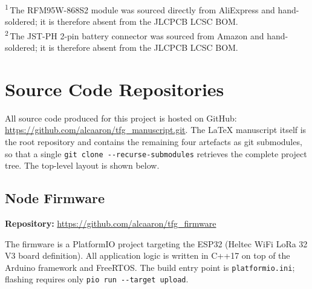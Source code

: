 \documentclass[english,bachelor]{tfgitic}[2026/01/22]
\begin{document}
\vspace{4pt}
\noindent\textsuperscript{1}\,The RFM95W-868S2 module was sourced directly from
AliExpress and hand-soldered; it is therefore absent from the JLCPCB LCSC BOM.\\
\noindent\textsuperscript{2}\,The JST-PH 2-pin battery connector was sourced from Amazon and hand-soldered; it is therefore absent from the JLCPCB LCSC BOM.

\chapter{Source Code Repositories}
\label{ch:appendix_repos}

All source code produced for this project is hosted on GitHub: \url{https://github.com/alcaaron/tfg_manuscript.git}. The LaTeX manuscript itself is the root repository and
contains the remaining four artefacts as git submodules, so that a single
\texttt{git clone -{}-recurse-submodules} retrieves the complete project tree.
The top-level layout is shown below.



\section{Node Firmware}
\label{sec:repo_firmware}

\noindent\textbf{Repository:}
\url{https://github.com/alcaaron/tfg_firmware}

\medskip
The firmware is a PlatformIO project targeting the ESP32 (Heltec WiFi LoRa 32
V3 board definition). All application logic is written in C++17 on top of the
Arduino framework and FreeRTOS. The build entry point is
\texttt{platformio.ini}; flashing requires only \texttt{pio run -{}-target
upload}.
\end{document}
